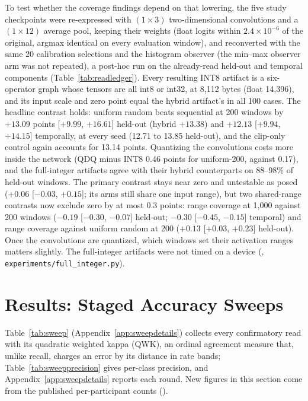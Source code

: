 \documentclass[10pt,twocolumn]{article}
\begin{document}
To test whether the coverage findings depend on that lowering, the five
study checkpoints were re-expressed with $(1\times3)$ two-dimensional
convolutions and a $(1\times12)$ average pool, keeping their weights
(float logits within $2.4\times10^{-6}$ of the original, argmax identical
on every evaluation window), and reconverted with the same 20 calibration
selections and the histogram observer (the min--max observer arm was not
repeated), a post-hoc run on the already-read held-out and temporal
components (Table~\ref{tab:readledger}). Every resulting INT8 artifact is
a six-operator graph whose tensors are all int8 or int32, at 8,112 bytes
(float 14,396), and its input scale and zero point equal the hybrid
artifact's in all 100 cases. The headline contrast holds: uniform random
beats sequential at 200 windows by $+13.09$ points [$+9.99$, $+16.61$]
held-out (hybrid $+13.38$) and $+12.13$ [$+9.94$, $+14.15$] temporally,
at every seed (12.71 to 13.85 held-out), and the clip-only control again
accounts for 13.14 points. Quantizing the convolutions costs more inside
the network (QDQ minus INT8 0.46 points for uniform-200, against 0.17),
and the full-integer artifacts agree with their hybrid counterparts on
88--98\% of held-out windows. The primary contrast stays near zero and
untestable as posed ($+0.06$ [$-0.03$, $+0.15$]; its arms still share one
input range), but two shared-range contrasts now exclude zero by at most
0.3 points: range coverage at 1,000 against 200 windows ($-0.19$
[$-0.30$, $-0.07$] held-out; $-0.30$ [$-0.45$, $-0.15$] temporal) and
range coverage against uniform random at 200 ($+0.13$ [$+0.03$, $+0.23$]
held-out). Once the convolutions are quantized, which windows set their
activation ranges matters slightly. The full-integer artifacts were not
timed on a device (,
\texttt{experiments/full\_integer.py}).

\section{Results: Staged Accuracy Sweeps}
\label{sec:sweepresults}

Table~\ref{tab:sweep} (Appendix~\ref{app:sweepdetails}) collects every
confirmatory read with its quadratic weighted kappa (QWK), an ordinal
agreement measure that, unlike recall, charges an error by its distance in
rate bands; Table~\ref{tab:sweepprecision} gives per-class precision, and
Appendix~\ref{app:sweepdetails} reports each round. New figures in this
section come from the published per-participant counts
().
\end{document}
